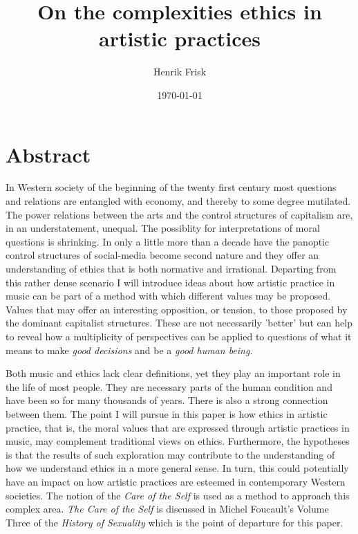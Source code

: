 \documentclass[11pt]{article}
\author{Henrik Frisk}
\date{\today}
\title{On the complexities ethics in artistic practices}
\begin{document}
\maketitle
\renewcommand\familydefault{\sfdefault}
\section*{Abstract}
\label{sec:org73ab571}
In Western society of the beginning of the twenty first century most questions and relations are entangled with economy, and thereby to some degree mutilated. The power relations between the arts and the control structures of capitalism are, in an understatement, unequal. The possiblity for interpretations of moral questions is shrinking. In only a little more than a decade have the panoptic control structures of social-media become second nature and they offer an understanding of ethics that is both normative and irrational. Departing from this rather dense scenario I will introduce ideas about how artistic practice in music can be part of a method with which different values may be proposed. Values that may offer an interesting opposition, or tension, to those proposed by the dominant capitalist structures. These are not necessarily 'better' but can help to reveal how a multiplicity of perspectives can be applied to questions of what it means to make \emph{good decisions} and be a \emph{good human being}.

Both music and ethics lack clear definitions, yet they play an important role in the life of most people. They are necessary parts of the human condition and have been so for many thousands of years. There is also a strong connection between them. The point I will pursue in this paper is how ethics in artistic practice, that is, the moral values that are expressed through artistic practices in music, may complement traditional views on ethics. Furthermore, the hypotheses is that the results of such exploration may contribute to the understanding of how we understand ethics in a more general sense. In turn, this could potentially have an impact on how artistic practices are esteemed in contemporary Western societies. The notion of the \emph{Care of the Self} is used as a method to approach this complex area. \emph{The Care of the Self} is discussed in Michel Foucault's Volume Three of the \emph{History of Sexuality} which is the point of departure for this paper.
\end{document}
